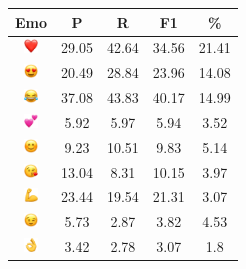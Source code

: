 \documentclass{article}
\begin{document}
\begin{table}
\centering
\begin{tabular}{|c|ccc|c|} \hline
\textbf{Emo} & \textbf{P} & \textbf{R} & \textbf{F1} & \textbf{\%} \\ \hline
\includegraphics[height=0.37cm,width=0.37cm]{img/red_heart.png} & 29.05 & 42.64 & 34.56 & 21.41\\ 
\includegraphics[height=0.37cm,width=0.37cm]{img/smiling_face_with_hearteyes.png} & 20.49 & 28.84 & 23.96 & 14.08\\ 
\includegraphics[height=0.37cm,width=0.37cm]{img/face_with_tears_of_joy.png} & 37.08 & 43.83 & 40.17 & 14.99\\ 
\includegraphics[height=0.37cm,width=0.37cm]{img/two_hearts.png} & 5.92 & 5.97 & 5.94 & 3.52\\ 
\includegraphics[height=0.37cm,width=0.37cm]{img/smiling_face_with_smiling_eyes.png} & 9.23 & 10.51 & 9.83 & 5.14\\ 
\includegraphics[height=0.37cm,width=0.37cm]{img/face_blowing_a_kiss.png} & 13.04 & 8.31 & 10.15 & 3.97\\ 
\includegraphics[height=0.37cm,width=0.37cm]{img/flexed_biceps.png} & 23.44 & 19.54 & 21.31 & 3.07\\ 
\includegraphics[height=0.37cm,width=0.37cm]{img/winking_face.png} & 5.73 & 2.87 & 3.82 & 4.53\\ 
\includegraphics[height=0.37cm,width=0.37cm]{img/OK_hand.png} & 3.42 & 2.78 & 3.07 & 1.8\\ 

\end{tabular}
\end{table}
\end{document}
